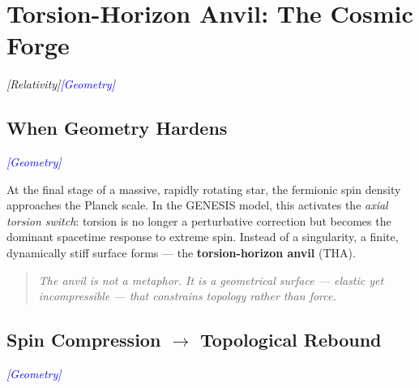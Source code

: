 \documentclass{article}
\newcommand{\geometrytag}{\textcolor{blue}{\textit{[Geometry]}}}
\newcommand{\grtag}{\textcolor{blue!40!black}{\textit{[Relativity]}}}
\begin{document}
\medskip
\begin{center}
\end{center}
\medskip





\section{Torsion-Horizon Anvil: The Cosmic Forge}
\label{sec:THA-intro}
\label{fig:THA-cavity}
\grtag \geometrytag

\subsection{When Geometry Hardens}
\label{subsec:THA-hardening}
\geometrytag

At the final stage of a massive, rapidly rotating star, the fermionic spin density approaches the Planck scale.
In the GENESIS model, this activates the \emph{axial torsion switch}: torsion is no longer a perturbative correction but becomes the dominant spacetime response to extreme spin.
Instead of a singularity, a finite, dynamically stiff surface forms --- the \textbf{torsion-horizon anvil} (THA).

\begin{quotation}
\emph{The anvil is not a metaphor. It is a geometrical surface --- elastic yet incompressible --- that constrains topology rather than force.}
\end{quotation}

\subsection{Spin Compression \texorpdfstring{$\!\rightarrow$}{->} Topological Rebound}
\label{subsec:THF-bounce}
\geometrytag
\end{document}
